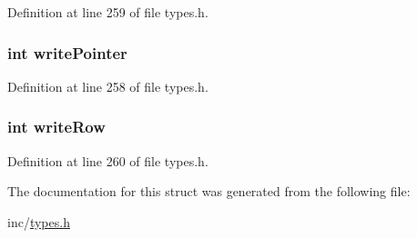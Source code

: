 Definition at line 259 of file types.h.

\hypertarget{structtty__s_a3a1ce6ba5935d1763d5b04f50fee62f7}{
\subsubsection[{writePointer}]{\setlength{\rightskip}{0pt plus 5cm}int {\bf writePointer}}}
\label{structtty__s_a3a1ce6ba5935d1763d5b04f50fee62f7}


Definition at line 258 of file types.h.

\hypertarget{structtty__s_a0bd76a596e01d0e7b4775aab29dcf425}{
\subsubsection[{writeRow}]{\setlength{\rightskip}{0pt plus 5cm}int {\bf writeRow}}}
\label{structtty__s_a0bd76a596e01d0e7b4775aab29dcf425}


Definition at line 260 of file types.h.



The documentation for this struct was generated from the following file:\begin{DoxyCompactItemize}
\item 
inc/\hyperlink{types_8h}{types.h}\end{DoxyCompactItemize}
